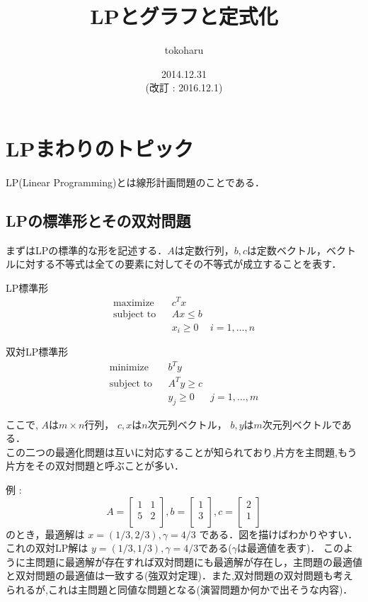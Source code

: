 \documentclass[13pt]{jarticle}
\title{LPとグラフと定式化}
\author{tokoharu}
\date {2014.12.31 \\ (改訂 : 2016.12.1)}
\theoremstyle{nonitalic} %
\begin{document}
\maketitle

\section{LPまわりのトピック}
LP(Linear Programming)とは線形計画問題のことである．
\subsection {LPの標準形とその双対問題}
まずはLPの標準的な形を記述する．$A$は定数行列，$b, c$は定数ベクトル，ベクトルに対する不等式は全ての要素に対してその不等式が成立することを表す．

LP標準形
\begin{align}
 &&&&&\textrm{maximize}   && c^Tx \\
 &&&&&\textrm{subject to} && Ax \leq b  &&&&&\\
 &&&&&                    && x_i \geq 0 & i = 1,\dots,n &&&&&
\end{align}

双対LP標準形
\begin{align}
 &&&&&\textrm{minimize}   && b^Ty \\
 &&&&&\textrm{subject to} && A^T y \geq c  &&&&&\\
 &&&&&                    && y_j \geq 0 & j = 1,\dots,m &&&&&
\end{align}

 
ここで, $A$は$m\times n$行列， 
$c,x$は$n$次元列ベクトル， 
$b,y$は$m$次元列ベクトルである． \\

この二つの最適化問題は互いに対応することが知られており,片方を主問題,もう片方をその双対問題と呼ぶことが多い．

例 : 
\begin{equation*}
 A = 
 \left[\begin{array}{cc}
  1 & 1 \\
  5 & 2 \\
 \end{array}\right],
 b = 
 \left[\begin{array}{c}
     1 \\
     3 \\
   \end{array}\right],
 c = 
 \left[\begin{array}{c}
     2 \\
     1 \\
 \end{array}\right]
\end{equation*}
のとき，最適解は $x = (1/3, 2/3) , \gamma = 4/3  $ である．図を描けばわかりやすい．これの双対LP解は
$y = (1/3, 1/3), \gamma = 4/3$である($\gamma$は最適値を表す)．
このように主問題に最適解が存在すれば双対問題にも最適解が存在し，主問題の最適値と双対問題の最適値は一致する(強双対定理)．また,双対問題の双対問題も考えられるが,これは主問題と同値な問題となる(演習問題か何かで出そうな内容)．
\end{document}
